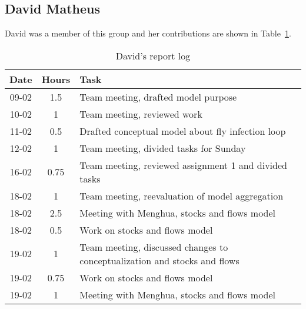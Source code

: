 \subsection{David Matheus}
David was a member of this group and her contributions are shown in Table~\ref{tab:david_log}. 
\begin{longtable}[c]{c|c|m{35em}}
\caption{David's report log}
\label{tab:david_log}\\
\textbf{Date}& \textbf{Hours} & \textbf{Task} \\
\hline
\endfirsthead
%
\endhead
%
09-02   &   1.5     &   Team meeting, drafted model purpose                                         \\
10-02   &   1       &   Team meeting, reviewed work                                                 \\
11-02   &   0.5     &   Drafted conceptual model about fly infection loop                           \\
12-02   &   1       &   Team meeting, divided tasks for Sunday                                      \\
16-02   &   0.75    &   Team meeting, reviewed assignment 1 and divided tasks                       \\
18-02   &   1       &   Team meeting, reevaluation of model aggregation                             \\
18-02   &   2.5     &   Meeting with Menghua, stocks and flows model                                \\
18-02   &   0.5     &   Work on stocks and flows model                                              \\
19-02   &   1       &   Team meeting, discussed changes to conceptualization and stocks and flows   \\
19-02   &   0.75    &   Work on stocks and flows model                                              \\
19-02   &   1       &   Meeting with Menghua, stocks and flows model                                \\
\end{longtable}